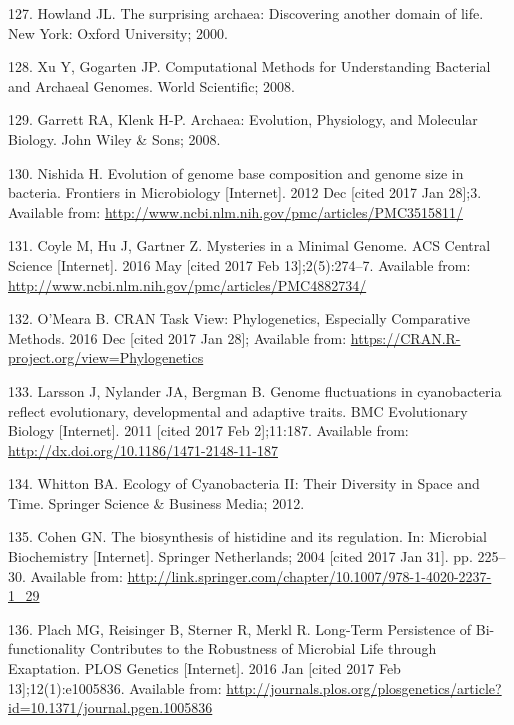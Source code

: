 \documentclass[12pt,twoside]{reedthesis}
\begin{document}
{  \hypertarget{ref-howland_surprising_2000}{}
  127. Howland JL. The surprising archaea: Discovering another domain of
  life. New York: Oxford University; 2000.
  
  \hypertarget{ref-xu_computational_2008}{}
  128. Xu Y, Gogarten JP. Computational Methods for Understanding
  Bacterial and Archaeal Genomes. World Scientific; 2008.
  
  \hypertarget{ref-garrett_archaea_2008}{}
  129. Garrett RA, Klenk H-P. Archaea: Evolution, Physiology, and
  Molecular Biology. John Wiley \& Sons; 2008.
  
  \hypertarget{ref-nishida_evolution_2012}{}
  130. Nishida H. Evolution of genome base composition and genome size in
  bacteria. Frontiers in Microbiology {[}Internet{]}. 2012 Dec {[}cited
  2017 Jan 28{]};3. Available from:
  \url{http://www.ncbi.nlm.nih.gov/pmc/articles/PMC3515811/}
  
  \hypertarget{ref-coyle_mysteries_2016}{}
  131. Coyle M, Hu J, Gartner Z. Mysteries in a Minimal Genome. ACS
  Central Science {[}Internet{]}. 2016 May {[}cited 2017 Feb
  13{]};2(5):274--7. Available from:
  \url{http://www.ncbi.nlm.nih.gov/pmc/articles/PMC4882734/}
  
  \hypertarget{ref-omeara_cran_2016}{}
  132. O'Meara B. CRAN Task View: Phylogenetics, Especially Comparative
  Methods. 2016 Dec {[}cited 2017 Jan 28{]}; Available from:
  \url{https://CRAN.R-project.org/view=Phylogenetics}
  
  \hypertarget{ref-larsson_genome_2011}{}
  133. Larsson J, Nylander JA, Bergman B. Genome fluctuations in
  cyanobacteria reflect evolutionary, developmental and adaptive traits.
  BMC Evolutionary Biology {[}Internet{]}. 2011 {[}cited 2017 Feb
  2{]};11:187. Available from:
  \url{http://dx.doi.org/10.1186/1471-2148-11-187}
  
  \hypertarget{ref-whitton_ecology_2012}{}
  134. Whitton BA. Ecology of Cyanobacteria II: Their Diversity in Space
  and Time. Springer Science \& Business Media; 2012.
  
  \hypertarget{ref-cohen_biosynthesis_2004}{}
  135. Cohen GN. The biosynthesis of histidine and its regulation. In:
  Microbial Biochemistry {[}Internet{]}. Springer Netherlands; 2004
  {[}cited 2017 Jan 31{]}. pp. 225--30. Available from:
  \url{http://link.springer.com/chapter/10.1007/978-1-4020-2237-1_29}
  
  \hypertarget{ref-plach_long-term_2016}{}
  136. Plach MG, Reisinger B, Sterner R, Merkl R. Long-Term Persistence of
  Bi-functionality Contributes to the Robustness of Microbial Life through
  Exaptation. PLOS Genetics {[}Internet{]}. 2016 Jan {[}cited 2017 Feb
  13{]};12(1):e1005836. Available from:
  \url{http://journals.plos.org/plosgenetics/article?id=10.1371/journal.pgen.1005836}
  
}
\end{document}
